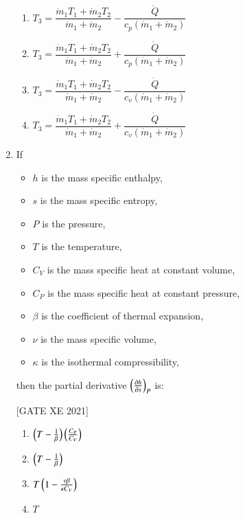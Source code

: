 \documentclass[journal,12pt,onecolumn]{IEEEtran}
\theoremstyle{remark}
\begin{document}
\begin{enumerate}[resume]
\begin{multicols}{2}
\begin{enumerate}
    \item $T_3 = \dfrac{\dot{m}_1 T_1 + \dot{m}_2 T_2}{\dot{m}_1 + \dot{m}_2} - \dfrac{\dot{Q}}{c_p(\dot{m}_1 + \dot{m}_2)}$
    \item $T_3 = \dfrac{\dot{m}_1 T_1 + \dot{m}_2 T_2}{\dot{m}_1 + \dot{m}_2} + \dfrac{\dot{Q}}{c_p(\dot{m}_1 + \dot{m}_2)}$
    \item $T_3 = \dfrac{\dot{m}_1 T_1 + \dot{m}_2 T_2}{\dot{m}_1 + \dot{m}_2} - \dfrac{\dot{Q}}{c_v(\dot{m}_1 + \dot{m}_2)}$
    \item $T_3 = \dfrac{\dot{m}_1 T_1 + \dot{m}_2 T_2}{\dot{m}_1 + \dot{m}_2} + \dfrac{\dot{Q}}{c_v(\dot{m}_1 + \dot{m}_2)}$
\end{enumerate}
\end{multicols}

\item If
\begin{itemize}
    \item $h$ is the mass specific enthalpy,
    \item $s$ is the mass specific entropy,
    \item $P$ is the pressure,
    \item $T$ is the temperature,
    \item $C_V$ is the mass specific heat at constant volume,
    \item $C_P$ is the mass specific heat at constant pressure,
    \item $\beta$ is the coefficient of thermal expansion,
    \item $\nu$ is the mass specific volume,
    \item $\kappa$ is the isothermal compressibility,
\end{itemize}
then the partial derivative $\left(\frac{\partial h}{\partial s}\right)_{P}$ is:

\hfill[GATE XE 2021]

\begin{multicols}{2} %
\begin{enumerate}
    \item $\left(T-\frac{1}{\beta}\right)\left(\frac{C_P}{C_V}\right)$
    \item $\left(T-\frac{1}{\beta}\right)$
    \item $T\left(1-\frac{\nu\beta}{\kappa C_V}\right)$
    \item $T$
\end{enumerate}
\end{multicols}


\end{enumerate}
\end{document}
